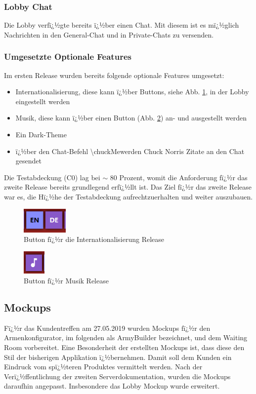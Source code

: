 \documentclass[12pt, titlepage]{scrartcl}
\newcommand{\RN}[1]{%
	\textup{\uppercase\expandafter{\romannumeral#1}}%
}
\begin{document}
	 	\subsubsection{Lobby Chat}
	 	Die Lobby verfï¿½gte bereits ï¿½ber einen Chat. Mit diesem ist es mï¿½glich Nachrichten in den General-Chat und in Private-Chats zu versenden.
	 	\subsubsection{Umgesetzte Optionale Features}
	 	Im ersten Release wurden bereits folgende optionale Features umgesetzt:
	 	\begin{itemize}
	 		\item Internationalisierung, diese kann ï¿½ber Buttons, siehe Abb. \ref{Internationalisierung_Release_One}, in der Lobby eingestellt werden 
	 		\item Musik, diese kann ï¿½ber einen Button (Abb. \ref{Musik_Release_One}) an- und ausgestellt werden 
	 		\item Ein Dark-Theme 
	 		\item ï¿½ber den Chat-Befehl \glqq \textbackslash chuckMe\grqq werden Chuck Norris Zitate an den Chat gesendet
	 	\end{itemize}
 		Die Testabdeckung (C0) lag bei $\sim$ 80 Prozent, womit die Anforderung fï¿½r das zweite Release bereits grundlegend erfï¿½llt ist. Das Ziel fï¿½r das zweite Release war es, die Hï¿½he der Testabdeckung aufrechtzuerhalten und weiter auszubauen.
 		\begin{figure}[H] 
 			\centering
 			\includegraphics[width=0.2\textwidth]{Internationalisierung_Release_One.PNG}
 			\caption{Button fï¿½r die Internationalisierung Release \RN{1}}
 			\label{Internationalisierung_Release_One}
 		\end{figure}
 		\begin{figure}[H] 
 			\centering
 			\includegraphics[width=0.1\textwidth]{Musik_Release_One.PNG}
 			\caption{Button fï¿½r Musik Release \RN{1}}
 			\label{Musik_Release_One}
 		\end{figure}
 		
	\subsection{Mockups}
		Fï¿½r das Kundentreffen am 27.05.2019 wurden Mockups fï¿½r den Armenkonfigurator, im folgenden als ArmyBuilder bezeichnet, und dem Waiting Room vorbereitet. Eine Besonderheit der erstellten Mockups ist, dass diese den Stil der bisherigen Applikation ï¿½bernehmen. Damit soll dem Kunden ein Eindruck vom spï¿½teren Produktes vermittelt werden. Nach der Verï¿½ffentlichung der zweiten Serverdokumentation, wurden die Mockups daraufhin angepasst. Insbesondere das  Lobby Mockup wurde erweitert.
\end{document}
